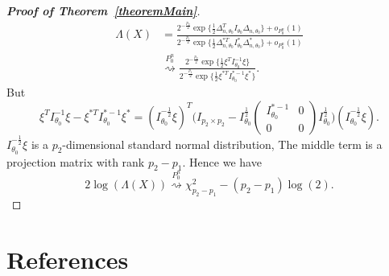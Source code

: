 \documentclass[3p]{elsarticle}
\theoremstyle{plain}
\newtheorem{theorem}{\quad\quad Theorem}
\theoremstyle{definition}
\theoremstyle{remark}
\begin{document}
\begin{appendices}
\begin{proof}[\textbf{Proof of Theorem~\ref{theoremMain}}]
\begin{equation}\label{equationNull}
    \begin{aligned} 
        \Lambda(X)&=
        \frac{2^{-\frac{p_2}{2}}\exp\{\frac{1}{2}\Delta_{n,\theta_0}^T I_{\theta_0}\Delta_{n,\theta_0}\}+o_{P_0^n}(1)
        }{2^{-\frac{p_1}{2}}\exp\{\frac{1}{2}\Delta_{n,\theta_0}^{*T}I^*_{\theta_0}\Delta^*_{n,\theta_0}\}+o_{P_0^n}(1)
        }
        \\
        &\overset{P_{0}^n}{\rightsquigarrow }
        \frac{2^{-\frac{p_2}{2}}\exp\{\frac{1}{2}\xi^T I^{-1}_{\theta_0}\xi\}
        }{2^{-\frac{p_1}{2}}\exp\{\frac{1}{2}\xi^{*T}I^{*-1}_{\theta_0}\xi^*\}
        }.
    \end{aligned}
\end{equation}
But
\begin{equation}\label{equationXi}
    \xi^T I^{-1}_{\theta_0}\xi -\xi^{*T}I^{*-1}_{\theta_0}\xi^*
    ={(I_{\theta_0}^{-\frac{1}{2}}\xi)}^T\Big(
        I_{p_{2}\times p_{2}}-
        I_{\theta_0}^{\frac{1}{2}}
        \left(\begin{matrix} 
                I^{*-1}_{\theta_0}&0\\
                0&0
        \end{matrix}\right)
        I_{\theta_0}^{\frac{1}{2}}
    \Big)(I_{\theta_0}^{-\frac{1}{2}}\xi).
\end{equation}
    $I_{\theta_0}^{-\frac{1}{2}}\xi$ is a $p_2$-dimensional standard normal distribution, The middle term is a projection matrix with rank $p_2-p_1$. Hence we have
\begin{equation}
    2\log(\Lambda(X))\overset{P_0^n}{\rightsquigarrow} \chi^2_{p_2-p_1}-(p_2-p_1)\log(2).
\end{equation}
\end{proof}

\end{appendices}

\section*{References}


\end{document}
